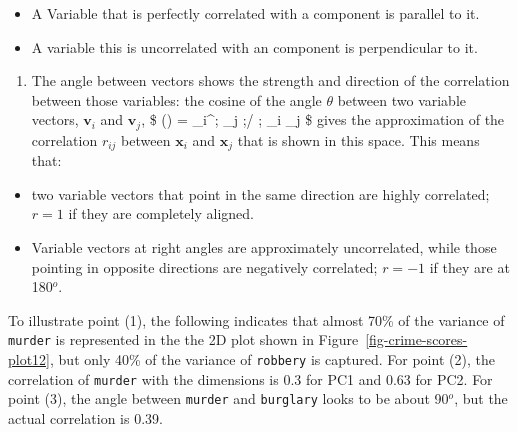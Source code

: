 \documentclass[
  letterpaper,
  10pt,
  krantz2]{krantz}
\providecommand{\tightlist}{%
  \setlength{\itemsep}{0pt}\setlength{\parskip}{0pt}}\usepackage{longtable,booktabs,array}
\begin{document}
\begin{itemize}
\tightlist
\item
  A Variable that is perfectly correlated with a component is parallel
  to it.
\item
  A variable this is uncorrelated with an component is perpendicular to
  it.
\end{itemize}

\begin{enumerate}
\def\labelenumi{(\arabic{enumi})}
\setcounter{enumi}{2}
\tightlist
\item
  The angle between vectors shows the strength and direction of the
  correlation between those variables: the cosine of the angle
  \(\theta\) between two variable vectors, \(\mathbf{v}_i\) and
  \(\mathbf{v}_j\), \$ \cos(\theta) = \_i\^{}\prime ;
  \_j ;/ ; \textbar{} \_i \textbar{}
  \cdot \textbar{} \_j \textbar\$ gives the approximation of
  the correlation \(r_{ij}\) between \(\mathbf{x}_i\) and
  \(\mathbf{x}_j\) that is shown in this space. This means that:
\end{enumerate}

\begin{itemize}
\tightlist
\item
  two variable vectors that point in the same direction are highly
  correlated; \(r = 1\) if they are completely aligned.
\item
  Variable vectors at right angles are approximately uncorrelated, while
  those pointing in opposite directions are negatively correlated;
  \(r = -1\) if they are at 180\(^o\).
\end{itemize}

To illustrate point (1), the following indicates that almost 70\% of the
variance of \texttt{murder} is represented in the the 2D plot shown in
Figure~\ref{fig-crime-scores-plot12}, but only 40\% of the variance of
\texttt{robbery} is captured. For point (2), the correlation of
\texttt{murder} with the dimensions is 0.3 for PC1 and 0.63 for PC2. For
point (3), the angle between \texttt{murder} and \texttt{burglary} looks
to be about 90\(^o\), but the actual correlation is 0.39.
\end{document}
